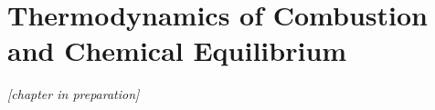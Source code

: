 \chapter{Thermodynamics of Combustion and Chemical Equilibrium}\label{ch:thermo}

\emph{[chapter in preparation]}
